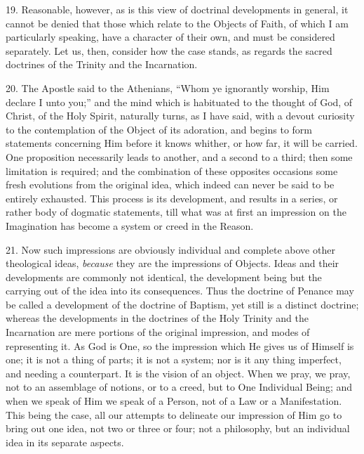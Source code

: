 19. Reasonable, however, as is this view of doctrinal developments
in general, it cannot be denied that those which relate to the Objects
of Faith, of which I am particularly speaking, have a character of
their own, and must be considered separately. Let us, then, consider
how the case stands, as regards the sacred doctrines of the Trinity
and the Incarnation.

20. The Apostle said to the Athenians, ``Whom ye ignorantly
worship, Him declare I unto you;'' and the mind which is
habituated to the thought of God, of Christ, of the Holy Spirit,
naturally turns, as I have said, with a devout curiosity to the
contemplation of the Object of its adoration, and begins to form
statements concerning Him before it knows whither, or how far, it will
be carried. One proposition necessarily leads to another, and a second
to a third; then some limitation is required; and the combination of
these opposites occasions some fresh evolutions from the original
idea, which indeed can never be said to be entirely exhausted. This
process is its development, and results in a series, or rather body of
dogmatic statements, till what was at first an impression on the
Imagination has become a system or creed in the Reason.

21. Now such impressions are obviously individual and complete
above other theological ideas, \emph{because} they are the impressions of
Objects. Ideas and their developments are commonly not identical, the
development being but the carrying out of the idea into its
consequences. Thus the doctrine of Penance may be called a development
of the doctrine of Baptism, yet still is a distinct doctrine; whereas
the developments in the doctrines of the Holy Trinity and the
Incarnation are mere portions of the original impression, and modes of
representing it. As God is One, so the impression which He gives us of
Himself is one; it is not a thing of parts; it is not a system; nor is
it any thing imperfect, and needing a counterpart. It is the vision of
an object. When we pray, we pray, not to an assemblage of notions, or
to a creed, but to One Individual Being; and when we speak of Him we
speak of a Person, not of a Law or a Manifestation. This being the
case, all our attempts to delineate our impression of Him go to bring
out one idea, not two or three or four; not a philosophy, but an
individual idea in its separate aspects.

